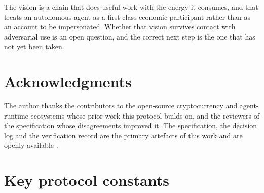 \documentclass{article}
\begin{document}
The vision is a chain that does useful work with the energy it consumes, and
that treats an autonomous agent as a first-class economic participant rather
than as an account to be impersonated. Whether that vision survives contact
with adversarial use is an open question, and the correct next step is the one
that has not yet been taken.


\section*{Acknowledgments}
The author thanks the contributors to the open-source cryptocurrency and
agent-runtime ecosystems whose prior work this protocol builds on, and the
reviewers of the specification whose disagreements improved it. The
specification, the decision log and the verification record are the primary
artefacts of this work and are openly available
\cite{jounit-spec,jounit-decisions,jounit-status,jounit-readiness,jounit-monetary,
jounit-fuzz}.






\appendix

\section{Key protocol constants}
\label{app:constants}
\end{document}
